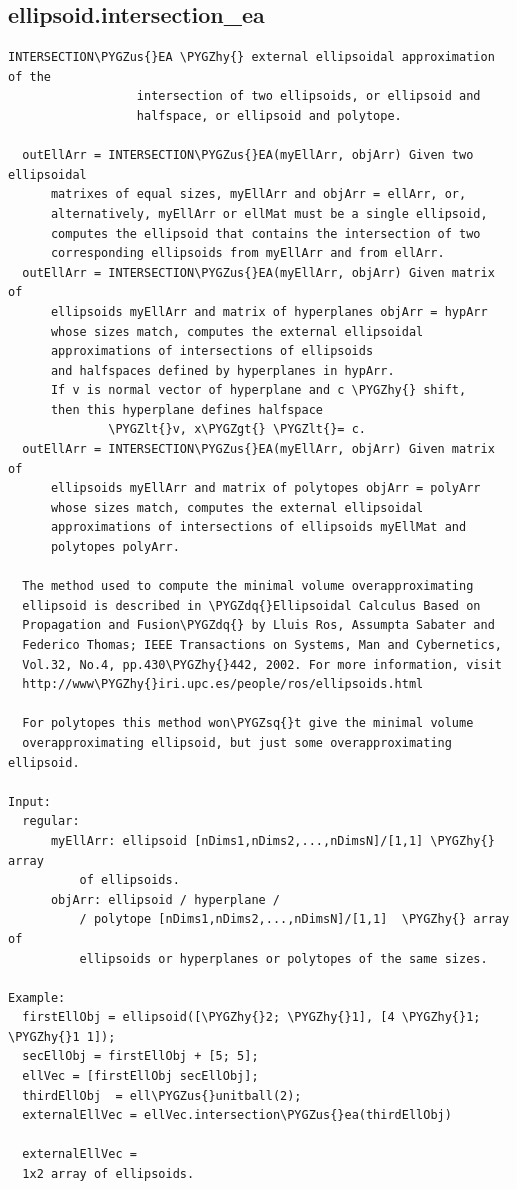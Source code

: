 \documentclass[letterpaper,10pt,english]{sphinxmanual}
\def\PYGZus{\char`\_}
\def\PYGZlt{\char`\<}
\def\PYGZgt{\char`\>}
\def\PYGZhy{\char`\-}
\def\PYGZsq{\char`\'}
\def\PYGZdq{\char`\"}
\begin{document}
\subsection{ellipsoid.intersection\_ea}
\label{chap_functions:ellipsoid-intersection-ea}
\begin{Verbatim}[commandchars=\\\{\}]
INTERSECTION\PYGZus{}EA \PYGZhy{} external ellipsoidal approximation of the
                  intersection of two ellipsoids, or ellipsoid and
                  halfspace, or ellipsoid and polytope.

  outEllArr = INTERSECTION\PYGZus{}EA(myEllArr, objArr) Given two ellipsoidal
      matrixes of equal sizes, myEllArr and objArr = ellArr, or,
      alternatively, myEllArr or ellMat must be a single ellipsoid,
      computes the ellipsoid that contains the intersection of two
      corresponding ellipsoids from myEllArr and from ellArr.
  outEllArr = INTERSECTION\PYGZus{}EA(myEllArr, objArr) Given matrix of
      ellipsoids myEllArr and matrix of hyperplanes objArr = hypArr
      whose sizes match, computes the external ellipsoidal
      approximations of intersections of ellipsoids
      and halfspaces defined by hyperplanes in hypArr.
      If v is normal vector of hyperplane and c \PYGZhy{} shift,
      then this hyperplane defines halfspace
              \PYGZlt{}v, x\PYGZgt{} \PYGZlt{}= c.
  outEllArr = INTERSECTION\PYGZus{}EA(myEllArr, objArr) Given matrix of
      ellipsoids myEllArr and matrix of polytopes objArr = polyArr
      whose sizes match, computes the external ellipsoidal
      approximations of intersections of ellipsoids myEllMat and
      polytopes polyArr.

  The method used to compute the minimal volume overapproximating
  ellipsoid is described in \PYGZdq{}Ellipsoidal Calculus Based on
  Propagation and Fusion\PYGZdq{} by Lluis Ros, Assumpta Sabater and
  Federico Thomas; IEEE Transactions on Systems, Man and Cybernetics,
  Vol.32, No.4, pp.430\PYGZhy{}442, 2002. For more information, visit
  http://www\PYGZhy{}iri.upc.es/people/ros/ellipsoids.html

  For polytopes this method won\PYGZsq{}t give the minimal volume
  overapproximating ellipsoid, but just some overapproximating ellipsoid.

Input:
  regular:
      myEllArr: ellipsoid [nDims1,nDims2,...,nDimsN]/[1,1] \PYGZhy{} array
          of ellipsoids.
      objArr: ellipsoid / hyperplane /
          / polytope [nDims1,nDims2,...,nDimsN]/[1,1]  \PYGZhy{} array of
          ellipsoids or hyperplanes or polytopes of the same sizes.

Example:
  firstEllObj = ellipsoid([\PYGZhy{}2; \PYGZhy{}1], [4 \PYGZhy{}1; \PYGZhy{}1 1]);
  secEllObj = firstEllObj + [5; 5];
  ellVec = [firstEllObj secEllObj];
  thirdEllObj  = ell\PYGZus{}unitball(2);
  externalEllVec = ellVec.intersection\PYGZus{}ea(thirdEllObj)

  externalEllVec =
  1x2 array of ellipsoids.
\end{Verbatim}
\end{document}
